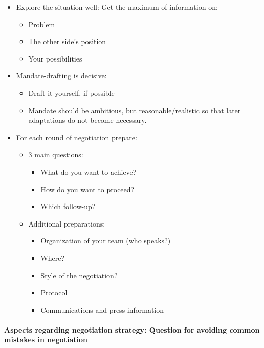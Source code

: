 \begin{itemize}
    \item Explore the situation well: Get the maximum of information on:
        \begin{itemize}
            \item Problem
            \item The other side's position
            \item Your possibilities
        \end{itemize}
    \item Mandate-drafting is decisive:
        \begin{itemize}
            \item Draft it yourself, if possible
            \item Mandate should be ambitious, but reasonable/realistic so that
                later adaptations do not become necessary.
        \end{itemize}
    \item For each round of negotiation prepare:
        \begin{itemize}
            \item 3 main questions:
                \begin{itemize}
                    \item What do you want to achieve?
                    \item How do you want to proceed?
                    \item Which follow-up?
                \end{itemize}
            \item Additional preparations:
                \begin{itemize}
                    \item Organization of your team (who speaks?)
                    \item Where?
                    \item Style of the negotiation?
                    \item Protocol
                    \item Communications and press information
                \end{itemize}
        \end{itemize}
\end{itemize}

\paragraph{Aspects regarding negotiation strategy: Question for avoiding
common mistakes in negotiation}

